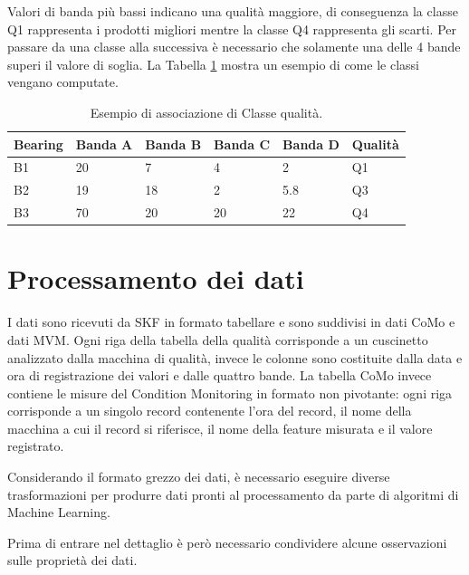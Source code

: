 Valori di banda più bassi indicano una qualità maggiore, di conseguenza la classe Q1 rappresenta i prodotti migliori mentre la classe Q4 rappresenta gli scarti. 
Per passare da una classe alla successiva è necessario che solamente una delle 4 bande superi il valore di soglia. 
La Tabella \ref{mvm-esempio} mostra un esempio di come le classi vengano computate.

\begin{table}
	\caption{\label{mvm-esempio}Esempio di associazione di Classe qualità.}
	\centering
	\begin{tabular}{|l|l|l|l|l|l|}
		\hline
		Bearing & \multicolumn{1}{c|}{Banda A} & \multicolumn{1}{c|}{Banda B} & \multicolumn{1}{c|}{Banda C} & \multicolumn{1}{c|}{Banda D} & Qualità \\ \hline
		B1      & 20                           & 7                            & 4                            & 2                            & Q1      \\ \hline
		B2      & 19                           & 18                           & 2                            & 5.8                          & Q3      \\ \hline
		B3      & 70                           & 20                           & 20                           & 22                           & Q4      \\ \hline
	\end{tabular}
\end{table}

\section{Processamento dei dati}
I dati sono ricevuti da SKF in formato tabellare e sono suddivisi in dati CoMo e dati MVM. Ogni riga della tabella della qualità corrisponde a un cuscinetto analizzato dalla macchina di qualità, invece le colonne sono costituite dalla data e ora di registrazione dei valori e dalle quattro bande.
La tabella CoMo invece contiene le misure del Condition Monitoring in formato non pivotante: ogni riga corrisponde a un singolo record contenente l'ora del record, il nome della macchina a cui il record si riferisce, il nome della feature misurata e il valore registrato.

Considerando il formato grezzo dei dati, è necessario eseguire diverse trasformazioni per produrre dati pronti al processamento da parte di algoritmi di Machine Learning. 

Prima di entrare nel dettaglio è però necessario condividere alcune osservazioni sulle proprietà dei dati.

